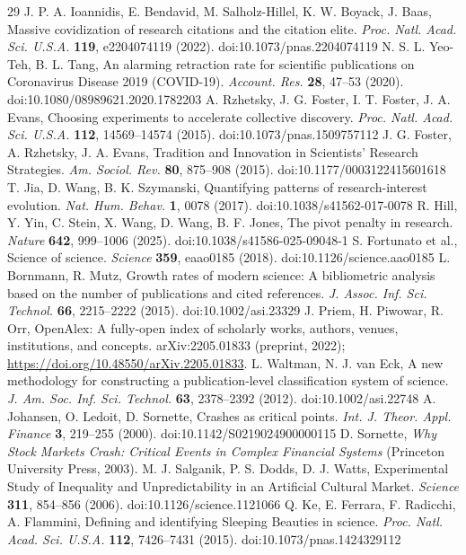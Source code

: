 \begin{thebibliography}{29}
 J. P. A. Ioannidis, E. Bendavid, M. Salholz-Hillel, K. W. Boyack, J. Baas, Massive covidization of research citations and the citation elite. \textit{Proc. Natl. Acad. Sci. U.S.A.} \textbf{119}, e2204074119 (2022). doi:10.1073/pnas.2204074119
 N. S. L. Yeo-Teh, B. L. Tang, An alarming retraction rate for scientific publications on Coronavirus Disease 2019 (COVID-19). \textit{Account. Res.} \textbf{28}, 47–53 (2020). doi:10.1080/08989621.2020.1782203
 A. Rzhetsky, J. G. Foster, I. T. Foster, J. A. Evans, Choosing experiments to accelerate collective discovery. \textit{Proc. Natl. Acad. Sci. U.S.A.} \textbf{112}, 14569–14574 (2015). doi:10.1073/pnas.1509757112
 J. G. Foster, A. Rzhetsky, J. A. Evans, Tradition and Innovation in Scientists’ Research Strategies. \textit{Am. Sociol. Rev.} \textbf{80}, 875–908 (2015). doi:10.1177/0003122415601618
 T. Jia, D. Wang, B. K. Szymanski, Quantifying patterns of research-interest evolution. \textit{Nat. Hum. Behav.} \textbf{1}, 0078 (2017). doi:10.1038/s41562-017-0078
 R. Hill, Y. Yin, C. Stein, X. Wang, D. Wang, B. F. Jones, The pivot penalty in research. \textit{Nature} \textbf{642}, 999–1006 (2025). doi:10.1038/s41586-025-09048-1
 S. Fortunato et al., Science of science. \textit{Science} \textbf{359}, eaao0185 (2018). doi:10.1126/science.aao0185
 L. Bornmann, R. Mutz, Growth rates of modern science: A bibliometric analysis based on the number of publications and cited references. \textit{J. Assoc. Inf. Sci. Technol.} \textbf{66}, 2215–2222 (2015). doi:10.1002/asi.23329
 J. Priem, H. Piwowar, R. Orr, OpenAlex: A fully-open index of scholarly works, authors, venues, institutions, and concepts. arXiv:2205.01833 (preprint, 2022); \url{https://doi.org/10.48550/arXiv.2205.01833}.
 L. Waltman, N. J. van Eck, A new methodology for constructing a publication‐level classification system of science. \textit{J. Am. Soc. Inf. Sci. Technol.} \textbf{63}, 2378–2392 (2012). doi:10.1002/asi.22748
 A. Johansen, O. Ledoit, D. Sornette, Crashes as critical points. \textit{Int. J. Theor. Appl. Finance} \textbf{3}, 219–255 (2000). doi:10.1142/S0219024900000115
 D. Sornette, \textit{Why Stock Markets Crash: Critical Events in Complex Financial Systems} (Princeton University Press, 2003).
 M. J. Salganik, P. S. Dodds, D. J. Watts, Experimental Study of Inequality and Unpredictability in an Artificial Cultural Market. \textit{Science} \textbf{311}, 854–856 (2006). doi:10.1126/science.1121066
 Q. Ke, E. Ferrara, F. Radicchi, A. Flammini, Defining and identifying Sleeping Beauties in science. \textit{Proc. Natl. Acad. Sci. U.S.A.} \textbf{112}, 7426–7431 (2015). doi:10.1073/pnas.1424329112
\end{thebibliography}
